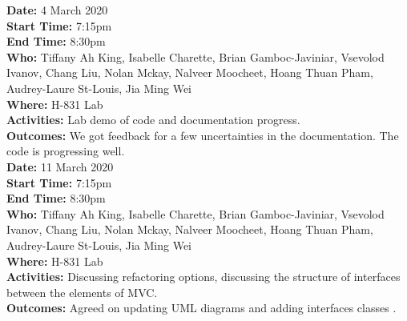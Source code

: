 \documentclass[12pt]{article}
\begin{document}
{\bf Date:} 4 March 2020\\
{\bf Start Time:} 7:15pm\\
{\bf End Time:} 8:30pm\\
{\bf Who:} Tiffany Ah King, Isabelle Charette, Brian Gamboc-Javiniar, Vsevolod Ivanov, Chang Liu, Nolan Mckay, Nalveer Moocheet, Hoang Thuan Pham, Audrey-Laure St-Louis, Jia Ming Wei\\
{\bf Where:} H-831 Lab \\
{\bf Activities:} Lab demo of code and documentation progress.\\
{\bf Outcomes:} We got feedback for a few uncertainties in the documentation. The code is progressing well.\\

{\bf Date:} 11 March 2020\\
{\bf Start Time:} 7:15pm\\
{\bf End Time:} 8:30pm\\
{\bf Who:} Tiffany Ah King, Isabelle Charette, Brian Gamboc-Javiniar, Vsevolod Ivanov, Chang Liu, Nolan Mckay, Nalveer Moocheet, Hoang Thuan Pham, Audrey-Laure St-Louis, Jia Ming Wei\\
{\bf Where:} H-831 Lab \\
{\bf Activities:} Discussing refactoring options, discussing the structure of interfaces between the elements of MVC.\\
{\bf Outcomes:} Agreed on updating UML diagrams and adding interfaces classes .\\
\end{document}
